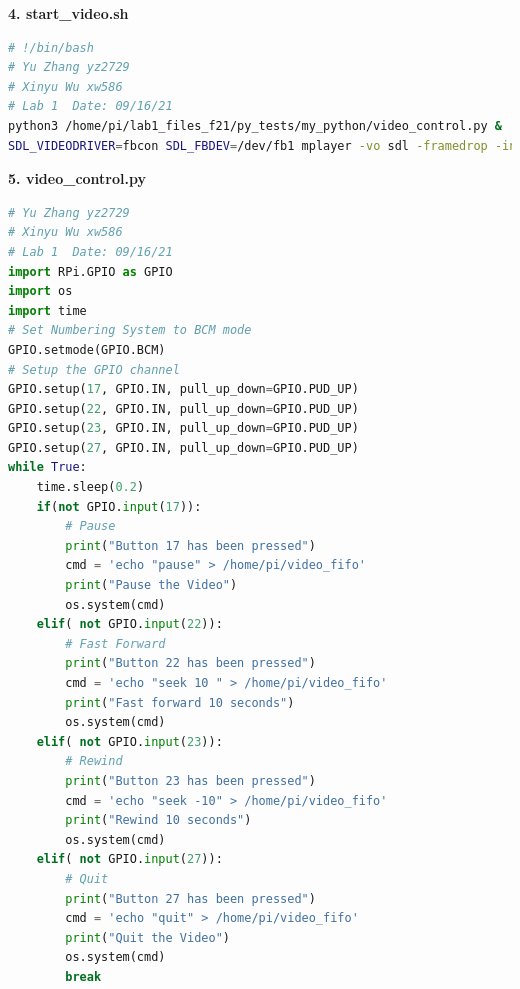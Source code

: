 \documentclass[12pt]{report}
\begin{document}
\textbf{4. start\_video.sh}
\begin{lstlisting}[language=Bash]
# !/bin/bash
# Yu Zhang yz2729
# Xinyu Wu xw586
# Lab 1  Date: 09/16/21
python3 /home/pi/lab1_files_f21/py_tests/my_python/video_control.py &
SDL_VIDEODRIVER=fbcon SDL_FBDEV=/dev/fb1 mplayer -vo sdl -framedrop -input file=/home/pi/video_fifo /home/pi/bigbuckbunny320p.mp4
\end{lstlisting}

\newpage
\textbf{5. video\_control.py} \label{code:5}
\begin{lstlisting}[language=Python] 
# Yu Zhang yz2729
# Xinyu Wu xw586
# Lab 1  Date: 09/16/21
import RPi.GPIO as GPIO
import os
import time
# Set Numbering System to BCM mode
GPIO.setmode(GPIO.BCM)
# Setup the GPIO channel
GPIO.setup(17, GPIO.IN, pull_up_down=GPIO.PUD_UP)
GPIO.setup(22, GPIO.IN, pull_up_down=GPIO.PUD_UP)
GPIO.setup(23, GPIO.IN, pull_up_down=GPIO.PUD_UP)
GPIO.setup(27, GPIO.IN, pull_up_down=GPIO.PUD_UP)
while True:
    time.sleep(0.2)
    if(not GPIO.input(17)):
        # Pause
        print("Button 17 has been pressed")
        cmd = 'echo "pause" > /home/pi/video_fifo'
        print("Pause the Video")
        os.system(cmd)
    elif( not GPIO.input(22)):
        # Fast Forward
        print("Button 22 has been pressed") 
        cmd = 'echo "seek 10 " > /home/pi/video_fifo'
        print("Fast forward 10 seconds")
        os.system(cmd)
    elif( not GPIO.input(23)):
        # Rewind
        print("Button 23 has been pressed")
        cmd = 'echo "seek -10" > /home/pi/video_fifo'
        print("Rewind 10 seconds")
        os.system(cmd)
    elif( not GPIO.input(27)):
        # Quit
        print("Button 27 has been pressed")
        cmd = 'echo "quit" > /home/pi/video_fifo'
        print("Quit the Video")
        os.system(cmd)
        break
\end{lstlisting}




\end{document}
